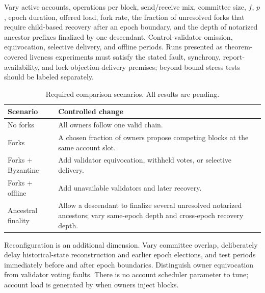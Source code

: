 \documentclass[10pt,twocolumn]{article}
\begin{document}
Vary active accounts, operations per block, send/receive mix, committee size, $f$, $p$, epoch duration, offered load, fork rate, the fraction of unresolved forks that require child-based recovery after an epoch boundary, and the depth of notarized ancestor prefixes finalized by one descendant. Control validator omission, equivocation, selective delivery, and offline periods. Runs presented as theorem-covered liveness experiments must satisfy the stated fault, synchrony, report-availability, and lock-objection-delivery premises; beyond-bound stress tests should be labeled separately.

\begin{table}[t]
\centering
\caption{Required comparison scenarios. All results are pending.}
\begin{tabularx}{\columnwidth}{@{}lX@{}}
\toprule
Scenario & Controlled change\\
\midrule
No forks & All owners follow one valid chain.\\
Forks & A chosen fraction of owners propose competing blocks at the same account slot.\\
Forks + Byzantine & Add validator equivocation, withheld votes, or selective delivery.\\
Forks + offline & Add unavailable validators and later recovery.\\
Ancestral finality & Allow a descendant to finalize several unresolved notarized ancestors; vary same-epoch depth and cross-epoch recovery depth.\\
\bottomrule
\end{tabularx}
\end{table}

Reconfiguration is an additional dimension. Vary committee overlap, deliberately delay historical-state reconstruction and earlier epoch elections, and test periods immediately before and after epoch boundaries. Distinguish owner equivocation from validator voting faults. There is no account scheduler parameter to tune; account load is generated by when owners inject blocks.

\begin{center}
\end{center}
\end{document}
